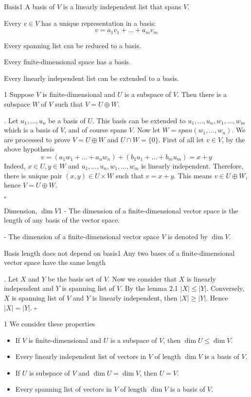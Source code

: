 \documentclass[11pt]{article}
\renewenvironment{proof}[1][\proofname]{\par\noindent\textit{#1.} }{\hfill$\square$\par}
\begin{document}
\begin{definition}{Basis}{1}
  A basis of $V$ is a linearly independent list that spans $V$.

Every $v \in V$ has a unique representation in a basis:
\[
  v = a_1v_1 + \dots + a_mv_m
\]
\end{definition}

Every spanning list can be reduced to a basis. 

Every finite-dimensional space has a basis. 

Every linearly independent list can be extended to a basis.
\begin{theorem}{}{1}
  Suppose $V$ is finite-dimensional and $U$ is a subspace of $V$. Then there is a subspace $W$ of $V$ such that $V = U \oplus W$.
\end{theorem}
\begin{proof}
  Let $u_1,\dots,u_n$ be a basis of $U$. This basis can be extended to $u_1,\dots,u_n,w_1,\dots,w_m$ which is a basis of $V$, and of course spans $V$. Now let $W = span(w_1,\dots,w_n)$. We are processed to prove $V = U \oplus W$ and $U \cap W = \{0\}$. First of all let $v \in V$, by the above hypothesis
  $$v = (a_1w_1 + \dots + a_nw_n )+( b_1u_1 + \dots + b_mu_m) = x +y$$
  Indeed, $x \in U, y \in W$ and $u_1,\dots,u_n,w_1,\dots,w_m$ is linearly independent. Therefore, there is unique pair $(x,y) \in U \times W$ such that $v = x + y$. This means $v \in U \oplus W$, hence $V = U \oplus W$.
  
\end{proof}
\begin{definition}{Dimension, $\dim V$}{1}
- The dimension of a finite-dimensional vector space is the length of any
basis of the vector space.

  - The dimension of a finite-dimensional vector space $V$ is denoted by $\dim V$.
\end{definition}
\begin{theorem}{Basis length does not depend on basis}{1}
  Any two bases of a finite-dimensional vector space have the same length
\end{theorem}
\begin{proof}
  Let $X$ and $Y$ be the basis set of $V$. Now we consider that $X$ is linearly independent and $Y$ is spanning list of $V$. By the lemma 2.1 $|X| \leq |Y|$. Conversely, $X$ is spanning list of $V$ and $Y$ is linearly independent, then $|X| \geq |Y|$. Hence $|X| = |Y|$.
\end{proof}
\begin{definition}{}{1}
We consider these properties
\begin{itemize}[label=-]
  \item If $V$ is finite-dimensional and $U$ is a subspace of $V$, then $\dim U \leq \dim V$.
  \item Every linearly independent list of vectors in $V$ of length $\dim V$ is a basis of $V$.
  \item If $U$ is subspace of $V$ and $\dim U = \dim V$, then $U = V$.
  \item Every spanning list of vectors in $V$ of length $\dim V$ is a basis of $V$.
\end{itemize}  
\end{definition}
\end{document}
